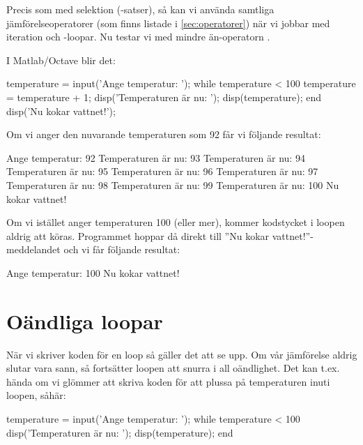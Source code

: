 
Precis som med selektion (-satser), så kan vi använda samtliga jämförelseoperatorer (som finns listade i \autoref{sec:operatorer}) när vi jobbar med iteration och -loopar. Nu testar vi med mindre än-operatorn \cw{<}.

I Matlab/Octave blir det:

\begin{matlab}[caption={Vår första while-loop},label={}]
temperature = input('Ange temperatur: ');
while temperature < 100
	temperature = temperature + 1;
	disp('Temperaturen är nu: ');
	disp(temperature);
end
disp('Nu kokar vattnet!');
\end{matlab}

Om vi anger den nuvarande temperaturen som 92 får vi följande resultat:

\vspace{10pt}
\begin{matlab}
Ange temperatur: 92
Temperaturen är nu:
93
Temperaturen är nu:
94
Temperaturen är nu:
95
Temperaturen är nu:
96
Temperaturen är nu:
97
Temperaturen är nu:
98
Temperaturen är nu:
99
Temperaturen är nu:
100
Nu kokar vattnet!
\end{matlab}

Om vi istället anger temperaturen 100 (eller mer), kommer kodstycket i loopen aldrig att köras. Programmet hoppar då direkt till ''Nu kokar vattnet!''-meddelandet och vi får följande resultat:

\vspace{10pt}
\begin{matlab}
Ange temperatur: 100
Nu kokar vattnet!
\end{matlab}

\section{Oändliga loopar}
När vi skriver koden för en loop så gäller det att se upp. Om vår jämförelse aldrig slutar vara sann, så fortsätter loopen att snurra i all oändlighet. Det kan t.ex. hända om vi glömmer att skriva koden för att plussa på temperaturen inuti loopen, såhär:

\begin{matlab}[caption={Oändlig loop, varning!},label={}]
temperature = input('Ange temperatur: ');
while temperature < 100
	disp('Temperaturen är nu: ');
	disp(temperature);
end
\end{matlab}

